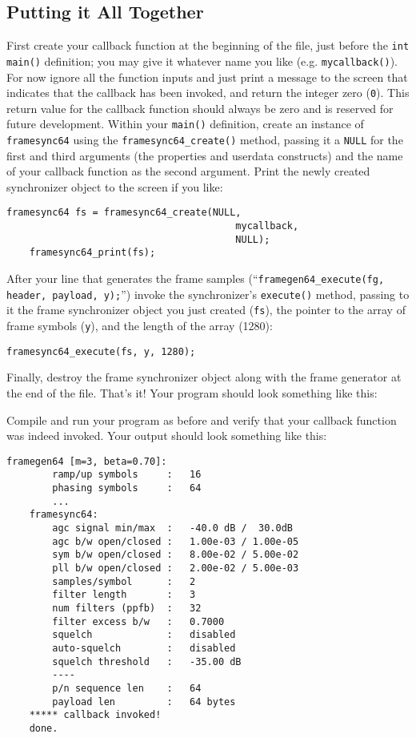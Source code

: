 %
%
\subsection{Putting it All Together}
\label{tutorial:framing:xxx}

First create your callback function at the beginning of the file, just
before the {\tt int main()} definition;
you may give it whatever name you like (e.g. {\tt mycallback()}).
For now ignore all the function inputs and just print a message to the
screen that indicates that the callback has been invoked,
and return the integer zero ({\tt 0}).
This return value for the callback function should always be zero
and is reserved for future development.
Within your {\tt main()} definition, create an instance of
{\tt framesync64} using the {\tt framesync64\_create()} method,
passing it a {\tt NULL} for the first and third arguments
(the properties and userdata constructs)
and the name of your callback function as the second argument.
Print the newly created synchronizer object to the screen if you like:
%
\begin{Verbatim}[fontsize=\small]
    framesync64 fs = framesync64_create(NULL,
                                        mycallback,
                                        NULL);
    framesync64_print(fs);
\end{Verbatim}
%
After your line that generates the frame samples
(``{\tt framegen64\_execute(fg, header, payload, y);}'')
invoke the synchronizer's {\tt execute()} method,
passing to it the frame synchronizer object you just created ({\tt fs}),
the pointer to the array of frame symbols ({\tt y}),
and the length of the array (1280):
%
\begin{Verbatim}[fontsize=\small]
    framesync64_execute(fs, y, 1280);
\end{Verbatim}
%
Finally, destroy the frame synchronizer object along with the frame
generator at the end of the file.
That's it!
Your program should look something like this:
%

%
Compile and run your program as before and verify that your callback
function was indeed invoked.
Your output should look something like this:
%
\begin{Verbatim}[fontsize=\small]
    framegen64 [m=3, beta=0.70]:
        ramp/up symbols     :   16
        phasing symbols     :   64
        ...
    framesync64:
        agc signal min/max  :   -40.0 dB /  30.0dB
        agc b/w open/closed :   1.00e-03 / 1.00e-05
        sym b/w open/closed :   8.00e-02 / 5.00e-02
        pll b/w open/closed :   2.00e-02 / 5.00e-03
        samples/symbol      :   2
        filter length       :   3
        num filters (ppfb)  :   32
        filter excess b/w   :   0.7000
        squelch             :   disabled
        auto-squelch        :   disabled
        squelch threshold   :   -35.00 dB
        ----
        p/n sequence len    :   64
        payload len         :   64 bytes
    ***** callback invoked!
    done.
\end{Verbatim}
